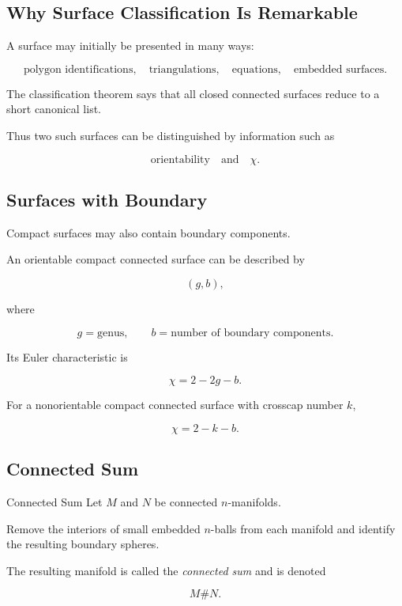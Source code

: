 \subsection{Why Surface Classification Is Remarkable}
\label{subsec:why-surface-classification}

A surface may initially be presented in many ways:

\[
\boxed{
\text{polygon identifications},
\quad
\text{triangulations},
\quad
\text{equations},
\quad
\text{embedded surfaces}.
}
\]

The classification theorem says that all closed connected surfaces reduce
to a short canonical list.

Thus two such surfaces can be distinguished by information such as

\[
\boxed{
\text{orientability}
\quad\text{and}\quad
\chi.
}
\]

\subsection{Surfaces with Boundary}
\label{subsec:surfaces-with-boundary-geometric}

Compact surfaces may also contain boundary components.

An orientable compact connected surface can be described by

\[
\boxed{
(g,b),
}
\]

where

\[
g=\text{genus},
\qquad
b=\text{number of boundary components}.
\]

Its Euler characteristic is

\[
\boxed{
\chi=2-2g-b.
}
\]

For a nonorientable compact connected surface with crosscap number \(k\),

\[
\boxed{
\chi=2-k-b.
}
\]

\subsection{Connected Sum}
\label{subsec:connected-sum-geometric}

\begin{definitionbox}{Connected Sum}
Let \(M\) and \(N\) be connected \(n\)-manifolds.

Remove the interiors of small embedded \(n\)-balls from each manifold and
identify the resulting boundary spheres.

The resulting manifold is called the \emph{connected sum} and is denoted

\[
\boxed{
M\#N.
}
\]
\end{definitionbox}

